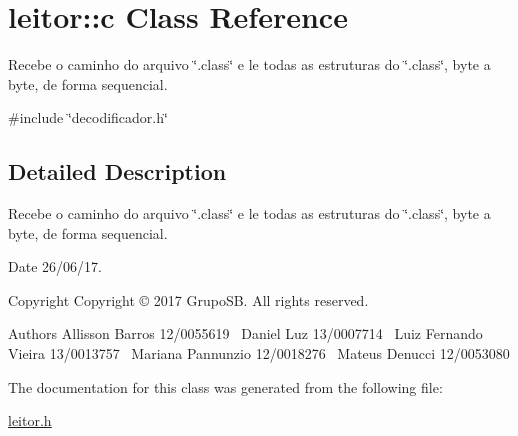 \hypertarget{classleitor_1_1c}{}\section{leitor\+:\+:c Class Reference}
\label{classleitor_1_1c}


Recebe o caminho do arquivo \char`\"{}.\+class\char`\"{} e le todas as estruturas do \char`\"{}.\+class\char`\"{}, byte a byte, de forma sequencial.  




{\ttfamily \#include \char`\"{}decodificador.\+h\char`\"{}}



\subsection{Detailed Description}
Recebe o caminho do arquivo \char`\"{}.\+class\char`\"{} e le todas as estruturas do \char`\"{}.\+class\char`\"{}, byte a byte, de forma sequencial. 

\begin{DoxyDate}{Date}
26/06/17. 
\end{DoxyDate}
\begin{DoxyCopyright}{Copyright}
Copyright © 2017 Grupo\+SB. All rights reserved.
\end{DoxyCopyright}
\begin{DoxyAuthor}{Authors}
Allisson Barros 12/0055619~\newline
Daniel Luz 13/0007714~\newline
Luiz Fernando Vieira 13/0013757~\newline
Mariana Pannunzio 12/0018276~\newline
Mateus Denucci 12/0053080 
\end{DoxyAuthor}


The documentation for this class was generated from the following file\+:\begin{DoxyCompactItemize}
\item 
\hyperlink{leitor_8h}{leitor.\+h}\end{DoxyCompactItemize}
